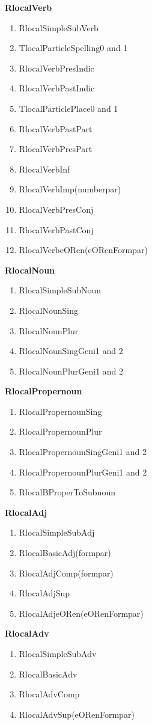 {\bf RlocalVerb}
\begin{enumerate}
\item RlocalSimpleSubVerb
\item TlocalParticleSpelling0 and 1
\item RlocalVerbPresIndic
\item RlocalVerbPastIndic
\item TlocalParticlePlace0 and 1
\item RlocalVerbPastPart
\item RlocalVerbPresPart
\item RlocalVerbInf
\item RlocalVerbImp(numberpar)
\item RlocalVerbPresConj
\item RlocalVerbPastConj
\item RlocalVerbeORen(eORenFormpar)
\end{enumerate}

\noindent
{\bf RlocalNoun}
\begin{enumerate}
\item RlocalSimpleSubNoun
\item RlocalNounSing
\item RlocalNounPlur
\item RlocalNounSingGeni1 and 2
\item RlocalNounPlurGeni1 and 2
\end{enumerate}

\noindent
{\bf RlocalPropernoun}
\begin{enumerate}
\item RlocalPropernounSing
\item RlocalPropernounPlur
\item RlocalPropernounSingGeni1 and 2
\item RlocalPropernounPlurGeni1 and 2
\item RlocalBProperToSubnoun
\end{enumerate}

\noindent
{\bf RlocalAdj}
\begin{enumerate}
\item RlocalSimpleSubAdj
\item RlocalBasicAdj(formpar)
\item RlocalAdjComp(formpar)
\item RlocalAdjSup
\item RlocalAdjeORen(eORenFormpar)
\end{enumerate}

\noindent
{\bf RlocalAdv}
\begin{enumerate}
\item RlocalSimpleSubAdv
\item RlocalBasicAdv
\item RlocalAdvComp
\item RlocalAdvSup(eORenFormpar)
\end{enumerate}

